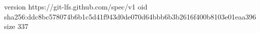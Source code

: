 version https://git-lfs.github.com/spec/v1
oid sha256:ddc8bc578074b6b1c5d41f943d0de070d64bbb6b3b2616f400b8103e01eaa396
size 337
